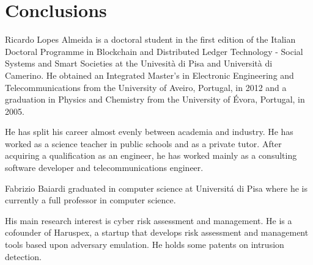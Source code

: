 \documentclass{ieeeaccess}
\begin{document}
\section{Conclusions}
\label{conclusion}





\begin{IEEEbiography}{Ricardo Lopes Almeida} is a doctoral student in the first edition of the Italian Doctoral Programme in Blockchain and Distributed Ledger Technology - Social Systems and Smart Societies at the Univesità di Pisa and Università di Camerino. He obtained an Integrated Master's in Electronic Engineering and Telecommunications from the University of Aveiro, Portugal, in 2012 and a graduation in Physics and Chemistry from the University of \'Evora, Portugal, in 2005.
    \par
    He has split his career almost evenly between academia and industry. He has
    worked as a science teacher in public schools and as a private tutor. After
    acquiring a qualification as an engineer, he has worked mainly as a consulting
    software developer and telecommunications engineer.
\end{IEEEbiography}

\begin{IEEEbiography}{Fabrizio Baiardi} graduated in computer science at Universit\'a di Pisa where he is currently a full professor in computer science.
    \par
    His main research interest is cyber risk assessment and management. He is a
    cofounder of Haruspex, a startup that develops risk assessment and management
    tools based upon adversary emulation. He holds some patents on intrusion
    detection.
\end{IEEEbiography}
\end{document}
